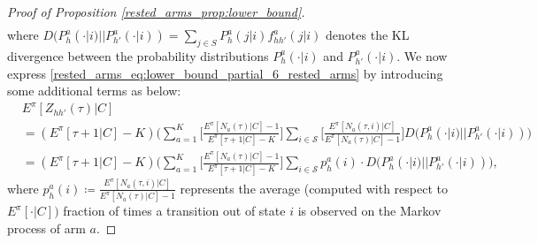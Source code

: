 \begin{proof}[Proof of Proposition \ref{rested_arms_prop:lower_bound}]
\begin{align}
\end{align}\endgroup
where $D(P_h^a(\cdot|i)||P_{h'}^a(\cdot|i))=\sum\limits_{j\in S}P_{h}^a(j|i)f^a_{hh'}(j|i)$ denotes the KL divergence between the probability distributions $P_h^a(\cdot|i)$ and $P_{h'}^a(\cdot|i)$. We now express \eqref{rested_arms_eq:lower_bound_partial_6_rested_arms} by introducing some additional terms as below:
\begingroup\allowdisplaybreaks\begin{align}
&E^\pi[Z_{hh'}(\tau)|C]\nonumber\\
&=(E^\pi[\tau+1|C]-K)
\bigg(\sum\limits_{a=1}^{K}\bigg[\frac{E^\pi[N_a(\tau)|C]-1}{E^\pi[\tau+1|C]-K}\bigg]\sum\limits_{i\in \mathcal{S}}\bigg[\frac{E^\pi[N_a(\tau,i)|C]}{E^\pi[N_a(\tau)|C]-1}\bigg]
D(P_h^a(\cdot|i)||P_{h'}^a(\cdot|i))\bigg)\nonumber\\
&=(E^\pi[\tau+1|C]-K)\bigg(\sum\limits_{a=1}^{K}\bigg[\frac{E^\pi[N_a(\tau)|C]-1}{E^\pi[\tau+1|C]-K}\bigg]
\sum\limits_{i\in \mathcal{S}}p_h^a(i)\cdot D(P_h^a(\cdot|i)||P_{h'}^a(\cdot|i))\bigg),\label{rested_arms_eq:lower_bound_partial_7_rested_arms}
\end{align}\endgroup
where $p_h^a(i)\coloneqq\frac{E^\pi[N_a(\tau,i)|C]}{E^\pi[N_a(\tau)|C]-1}$ represents the average (computed with respect to $E^\pi[\cdot|C])$ fraction of times a transition {out} of state $i$ is observed on the Markov process of arm $a$.


\end{proof}
